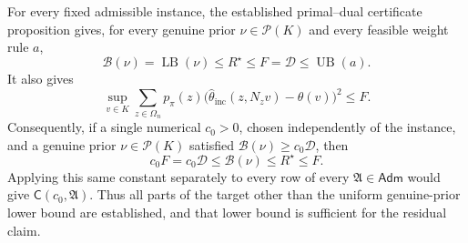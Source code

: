 For every fixed admissible instance, the established primal--dual certificate proposition gives, for every genuine prior \(\nu\in\mathcal P(K)\) and every feasible weight rule \(a\),
\[
 \mathcal B(\nu)=\operatorname{LB}(\nu)
 \le R^{\star}\le F=\mathcal D\le \operatorname{UB}(a).
\]
It also gives
\[
 \sup_{v\in K}\sum_{z\in\Omega_n}p_{\pi}(z)
 \bigl(\widehat\theta_{\mathrm{inc}}(z,N_zv)-\theta(v)\bigr)^2\le F.
\]
Consequently, if a single numerical \(c_0>0\), chosen independently of the instance, and a genuine prior \(\nu\in\mathcal P(K)\) satisfied \(\mathcal B(\nu)\ge c_0\mathcal D\), then
\[
 c_0F=c_0\mathcal D\le\mathcal B(\nu)\le R^{\star}\le F.
\]
Applying this same constant separately to every row of every \(\mathfrak A\in\mathsf{Adm}\) would give \(\mathsf C(c_0,\mathfrak A)\). Thus all parts of the target other than the uniform genuine-prior lower bound are established, and that lower bound is sufficient for the residual claim.